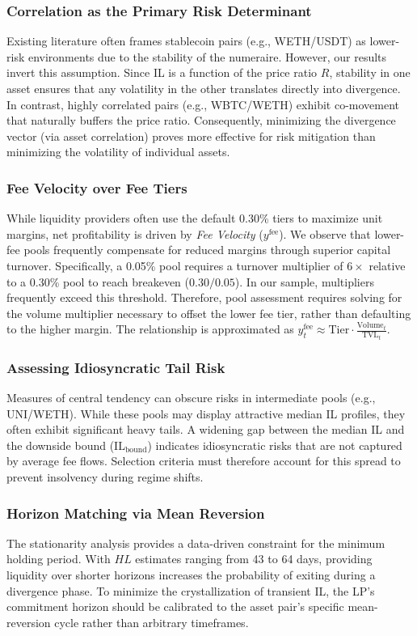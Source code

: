 \documentclass[journal]{IEEEtran}
\begin{document}
\subsubsection{Correlation as the Primary Risk Determinant}
Existing literature often frames stablecoin pairs (e.g., WETH/USDT) as lower-risk environments due to the stability of the numeraire. However, our results invert this assumption. Since IL is a function of the price ratio $R$, stability in one asset ensures that any volatility in the other translates directly into divergence. In contrast, highly correlated pairs (e.g., WBTC/WETH) exhibit co-movement that naturally buffers the price ratio. Consequently, minimizing the divergence vector (via asset correlation) proves more effective for risk mitigation than minimizing the volatility of individual assets.

\subsubsection{Fee Velocity over Fee Tiers}
While liquidity providers often use the default 0.30\% tiers to maximize unit margins, net profitability is driven by \emph{Fee Velocity} ($y^{\text{fee}}$). We observe that lower-fee pools frequently compensate for reduced margins through superior capital turnover. Specifically, a 0.05\% pool requires a turnover multiplier of $6\times$ relative to a 0.30\% pool to reach breakeven ($0.30/0.05$). In our sample, multipliers frequently exceed this threshold. Therefore, pool assessment requires solving for the volume multiplier necessary to offset the lower fee tier, rather than defaulting to the higher margin.
The relationship is approximated as
$
y^{\text{fee}}_t \approx \text{Tier} \cdot \frac{\text{Volume}_t}{\text{TVL}_t}.
$

\subsubsection{Assessing Idiosyncratic Tail Risk}
Measures of central tendency can obscure risks in intermediate pools (e.g., UNI/WETH). While these pools may display attractive median IL profiles, they often exhibit significant heavy tails. A widening gap between the median IL and the downside bound ($\mathrm{IL}_{\text{bound}}$) indicates idiosyncratic risks that are not captured by average fee flows. Selection criteria must therefore account for this spread to prevent insolvency during regime shifts.

\subsubsection{Horizon Matching via Mean Reversion}
The stationarity analysis provides a data-driven constraint for the minimum holding period. With $HL$ estimates ranging from 43 to 64 days, providing liquidity over shorter horizons increases the probability of exiting during a divergence phase. To minimize the crystallization of transient IL, the LP's commitment horizon should be calibrated to the asset pair's specific mean-reversion cycle rather than arbitrary timeframes.
\end{document}
